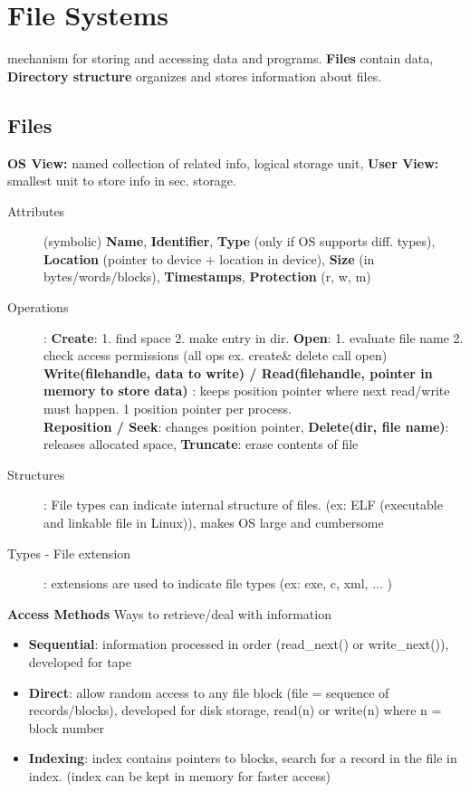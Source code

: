 \section*{File Systems}
mechanism for storing and accessing data and programs. \textbf{Files} contain data, \textbf{Directory structure} organizes and stores information about files.
\subsection*{Files}
\textbf{OS View:}  named collection of related info, logical storage unit, \textbf{User View:}  smallest unit to store info in sec. storage.
\begin{description}
    \item[Attributes](symbolic) \textbf{Name}, \textbf{Identifier},  \textbf{Type} (only if OS supports diff. types), \textbf{Location} (pointer to device + location in device), \textbf{Size} (in bytes/words/blocks), \textbf{Timestamps}, \textbf{Protection} (r, w, m)
    \item[Operations]: \textbf{Create}: 1. find space 2. make entry in dir. \textbf{Open}: 1. evaluate file name 2. check access permissions (all ops ex. create\& delete call open) \textbf{Write(filehandle, data to write) / Read(filehandle, pointer in memory to store data) }: keeps position pointer where next read/write must happen. 1 position pointer per process. \\
    \textbf{Reposition / Seek}: changes position pointer, \textbf{Delete(dir, file name)}: releases allocated space, \textbf{Truncate}: erase contents of file
    \item[Structures]: File types can indicate internal structure of files. (ex: ELF (executable and linkable file in Linux)), makes OS large and cumbersome
    \item[Types - File extension]: extensions are used to indicate file types (ex: exe, c, xml, ... )
\end{description}
\textbf{Access Methods} Ways to retrieve/deal with information
\begin{itemize}
    \item \textbf{Sequential}: information processed in order (read\_next() or write\_next()), developed for tape
    \item \textbf{Direct}: allow random access to any file block (file = sequence of records/blocks), developed for disk storage, read(n) or write(n) where n = block number
    \item \textbf{Indexing}: index contains pointers to blocks, search for a record in the file in index. (index can be kept in memory for faster access)
\end{itemize}
